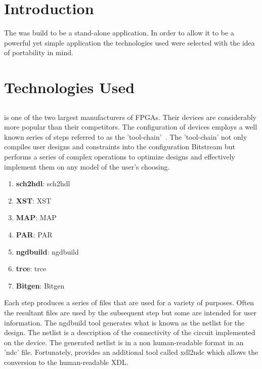 \label{chapter:implementation}
\section{Introduction}
The \Name was build to be a stand-alone application.
In order to allow it to be a powerful yet simple application the technologies used were selected with the idea of portability in mind.

\section{Technologies Used}
\subsection{\Xilinx}
\Xilinx is one of the two largest manufacturers of \acrshort{FPGA}s. 
Their devices are considerably more popular than their competitors.
The configuration of devices employs a well known series of steps referred to as the \Xilinx 'tool-chain'~\cite{xilnxDevManual}.
The 'tool-chain' not only compiles user designs and constraints into the configuration \gls{Bitstream} but performs a series of complex operations to optimize designs and effectively implement them on any \Xilinx model of the user's choosing.
\begin{enumerate}
	\item \textbf{\gls{sch2hdl}}: \glsdesc{sch2hdl}
	\item \textbf{\gls{XST}}: \glsdesc{XST}
	\item \textbf{\gls{MAP}}: \glsdesc{MAP}
	\item \textbf{\gls{PAR}}: \glsdesc{PAR}
	\item \textbf{\gls{ngdbuild}}: \glsdesc{ngdbuild}
	\item \textbf{\gls{trce}}: \glsdesc{trce}
	\item \textbf{\gls{Bitgen}}: \glsdesc{Bitgen}
\end{enumerate}
Each step produces a series of files that are used for a variety of purposes. 
Often the resultant files are used by the subsequent step but some are intended for user information.
The \gls{ngdbuild} tool generates what is known as the netlist for the design.
The netlist is a description of the connectivity of the circuit implemented on the device. 
The generated netlist is in a non human-readable format in an 'ndc' file.
Fortunately, \Xilinx provides an additional tool called \acrshort{xdl2ndc} which allows the conversion to the human-readable \acrfull{XDL}.
